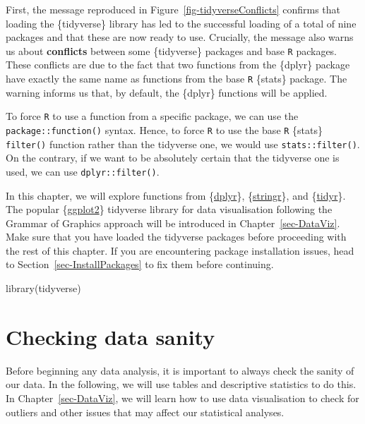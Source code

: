 \documentclass[
  letterpaper,
  DIV=11,
  numbers=noendperiod]{scrreprt}
\newenvironment{Shaded}{\begin{snugshade}}{\end{snugshade}}
\newcommand{\FunctionTok}[1]{\textcolor[rgb]{0.28,0.35,0.67}{#1}}
\newcommand{\NormalTok}[1]{\textcolor[rgb]{0.00,0.23,0.31}{#1}}
\begin{document}
First, the message reproduced in Figure~\ref{fig-tidyverseConflicts}
confirms that loading the \{tidyverse\} library has led to the
successful loading of a total of nine packages and that these are now
ready to use. Crucially, the message also warns us about
\textbf{conflicts} between some \{tidyverse\} packages and base
\texttt{R} packages. These conflicts are due to the fact that two
functions from the \{dplyr\} package have exactly the same name as
functions from the base \texttt{R} \{stats\} package. The warning
informs us that, by default, the \{dplyr\} functions will be applied.

To force \texttt{R} to use a function from a specific package, we can
use the \texttt{package::function()} syntax. Hence, to force \texttt{R}
to use the base \texttt{R} \{stats\} \texttt{filter()} function rather
than the tidyverse one, we would use \texttt{stats::filter()}. On the
contrary, if we want to be absolutely certain that the tidyverse one is
used, we can use \texttt{dplyr::filter()}.

In this chapter, we will explore functions from
\{\href{https://dplyr.tidyverse.org/}{dplyr}\},
\{\href{https://stringr.tidyverse.org/}{stringr}\}, and
\{\href{https://tidyr.tidyverse.org/}{tidyr}\}. The popular
\{\href{https://ggplot2.tidyverse.org/}{ggplot2}\} tidyverse library for
data visualisation following the Grammar of Graphics approach will be
introduced in Chapter~\ref{sec-DataViz}. Make sure that you have loaded
the tidyverse packages before proceeding with the rest of this chapter.
If you are encountering package installation issues, head to
Section~\ref{sec-InstallPackages} to fix them before continuing.

\begin{Shaded}
\begin{Highlighting}[]
\FunctionTok{library}\NormalTok{(tidyverse)}
\end{Highlighting}
\end{Shaded}

\section{Checking data sanity}\label{sec-Sanity}

Before beginning any data analysis, it is important to always check the
sanity of our data. In the following, we will use tables and descriptive
statistics to do this. In Chapter~\ref{sec-DataViz}, we will learn how
to use data visualisation to check for outliers and other issues that
may affect our statistical analyses.
\end{document}

